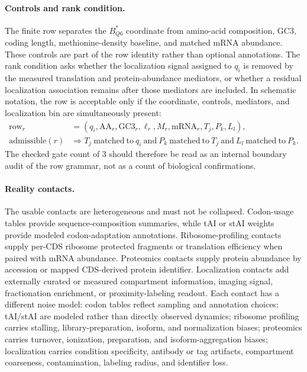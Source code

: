 \paragraph{Controls and rank condition.}
The finite row separates the $B^{\ast}_{Q6}$ coordinate from amino-acid composition, GC3, coding length, methionine-density baseline, and matched mRNA abundance.  These controls are part of the row identity rather than optional annotations.  The rank condition asks whether the localization signal assigned to $q_i$ is removed by the measured translation and protein-abundance mediators, or whether a residual localization association remains after those mediators are included.  In schematic notation, the row is acceptable only if the coordinate, controls, mediators, and localization bin are simultaneously present:
$$
\begin{aligned}
\mathrm{row}_r &= (q_i,\mathrm{AA}_r,\mathrm{GC3}_r,\ell_r,M_r,\mathrm{mRNA}_r,T_j,P_k,L_l),\\
\mathrm{admissible}(r) &\Rightarrow T_j\ \mathrm{matched\ to}\ q_i\ \mathrm{and}\ P_k\ \mathrm{matched\ to}\ T_j\ \mathrm{and}\ L_l\ \mathrm{matched\ to}\ P_k.
\end{aligned}
$$
The checked gate count of $3$ should therefore be read as an internal boundary audit of the row grammar, not as a count of biological confirmations.

\paragraph{Reality contacts.}
The usable contacts are heterogeneous and must not be collapsed.  Codon-usage tables provide sequence-composition summaries, while tAI or stAI weights provide modeled codon-adaptation annotations.  Ribosome-profiling contacts supply per-CDS ribosome protected fragments or translation efficiency when paired with mRNA abundance.  Proteomics contacts supply protein abundance by accession or mapped CDS-derived protein identifier.  Localization contacts add externally curated or measured compartment information, imaging signal, fractionation enrichment, or proximity-labeling readout.  Each contact has a different noise model: codon tables reflect sampling and annotation choices; tAI/stAI are modeled rather than directly observed dynamics; ribosome profiling carries stalling, library-preparation, isoform, and normalization biases; proteomics carries turnover, ionization, preparation, and isoform-aggregation biases; localization carries condition specificity, antibody or tag artifacts, compartment coarseness, contamination, labeling radius, and identifier loss.

